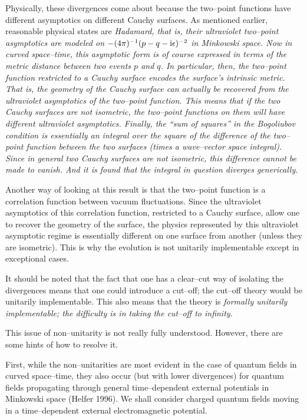 Physically, these divergences come about 
because the two--point functions have different
asymptotics on different Cauchy surfaces.  As
mentioned earlier, reasonable physical states are \it Hadamard, \rm
that is, their ultraviolet two--point asymptotics are modeled on
$-(4\pi )^{-1}(p-q-\i\epsilon )^{-2}$ in Minkowski space.  Now in
curved space--time, this asymptotic form is of course expressed in
terms of the metric distance between two events $p$ and $q$.  In
particular, then, the two--point function restricted to a Cauchy
surface encodes the surface's 
intrinsic metric.  That is, the geometry of the
Cauchy surface can actually be recovered from the ultraviolet
asymptotics of the two--point function.  This means that if the two
Cauchy surfaces are not isometric, the two--point functions on them
will have different ultraviolet asymptotics.  Finally, the
``sum of squares'' in the Bogoliubov condition is essentially an
integral over the square of the difference of the two--point function
between the two surfaces (times a wave--vector space integral).  
Since in general two Cauchy surfaces are not isometric, this
difference cannot be made to vanish.
And it is found that the integral in question diverges
generically.  

Another way of looking at this result is that the two--point function
is a correlation function between vacuum fluctuations.  Since the
ultraviolet asymptotics of this
correlation function, restricted to a Cauchy surface, allow one to
recover the geometry of the surface, the physics represented by this
ultraviolet asymptotic regime is essentially different on one surface
from another (unless they are isometric).  This is why the evolution
is not unitarily implementable except in exceptional cases.

It should be noted that the fact that one has a clear--cut way of
isolating the divergences means that one could introduce a cut--off;
the cut--off theory would be unitarily implementable.  This also
means that the theory is \it formally \rm unitarily implementable; the
difficulty is in taking the cut--off to infinity.
 
This issue of non--unitarity is not really fully understood.
However, there are some hints of how to resolve it.

First, while the non--unitarities are most evident in the case of
quantum fields in curved space--time, they also occur (but with lower
divergences) for quantum fields propagating through general
time--dependent external potentials in Minkowski space (Helfer
1996).  
We shall consider charged quantum fields moving in a time--dependent
external electromagnetic potential.

